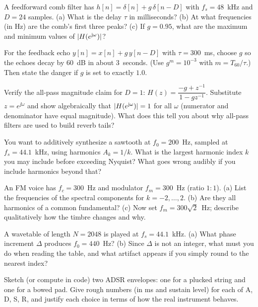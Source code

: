 \begin{exercise}
A feedforward comb filter has $h[n]=\delta[n]+g\,\delta[n-D]$ with $f_s=48$~kHz
and $D=24$ samples. (a) What is the delay $\tau$ in milliseconds? (b) At what
frequencies (in Hz) are the comb's first three peaks? (c) If $g=0.95$, what are
the maximum and minimum values of $\lvert H(e^{\mathrm{j}\omega})\rvert$?
\end{exercise}

\begin{exercise}
For the feedback echo $y[n]=x[n]+g\,y[n-D]$ with $\tau=300$~ms, choose $g$ so the
echoes decay by $60$~dB in about $3$~seconds. (Use $g^m=10^{-3}$ with
$m=T_{60}/\tau$.) Then state the danger if $g$ is set to exactly $1.0$.
\end{exercise}

\begin{exercise}
Verify the all-pass magnitude claim for $D=1$:
$H(z)=\dfrac{-g+z^{-1}}{1-g z^{-1}}$. Substitute $z=e^{\jj\omega}$ and show
algebraically that $\lvert H(e^{\mathrm{j}\omega})\rvert=1$ for all $\omega$ (numerator and
denominator have equal magnitude). What does this tell you about why all-pass
filters are used to build reverb tails?
\end{exercise}

\begin{exercise}
You want to additively synthesize a sawtooth at $f_0=200$~Hz, sampled at
$f_s=44.1$~kHz, using harmonics $A_k=1/k$. What is the largest harmonic index
$k$ you may include before exceeding Nyquist? What goes wrong audibly if you
include harmonics beyond that?
\end{exercise}

\begin{exercise}
An FM voice has $f_c=300$~Hz and modulator $f_m=300$~Hz (ratio $1{:}1$). (a) List
the frequencies of the spectral components for $k=-2,\dots,2$. (b) Are they all
harmonics of a common fundamental? (c) Now set $f_m=300\sqrt{2}$~Hz; describe
qualitatively how the timbre changes and why.
\end{exercise}

\begin{exercise}
A wavetable of length $N=2048$ is played at $f_s=44.1$~kHz. (a) What phase
increment $\Delta$ produces $f_0=440$~Hz? (b) Since $\Delta$ is not an integer,
what must you do when reading the table, and what artifact appears if you simply
round to the nearest index?
\end{exercise}

\begin{exercise}
Sketch (or compute in code) two ADSR envelopes: one for a plucked string and one
for a bowed pad. Give rough numbers (in ms and sustain level) for each of A, D,
S, R, and justify each choice in terms of how the real instrument behaves.
\end{exercise}

